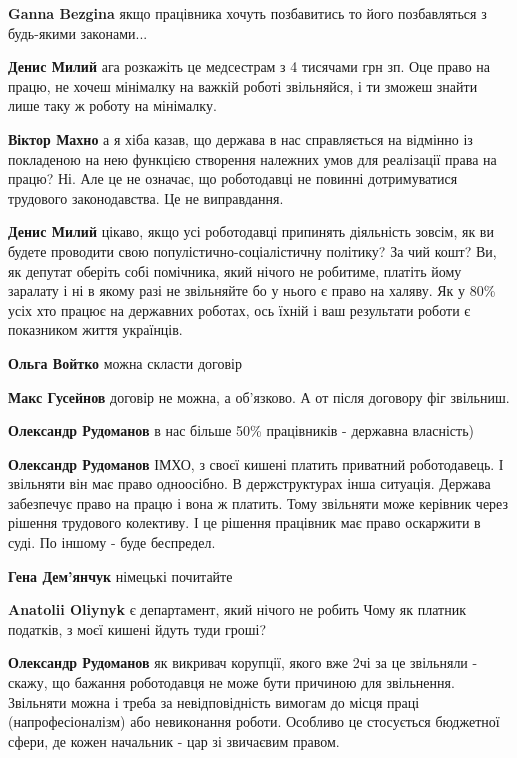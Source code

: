 \begin{itemize}
\begin{itemize}
\textbf{Ganna Bezgina} якщо працівника хочуть позбавитись то його позбавляться з будь-якими законами...

\textbf{Денис Милий} ага розкажіть це медсестрам з 4 тисячами грн зп. Оце право на працю, не хочеш мінімалку на важкій роботі звільняйся, і ти зможеш знайти лише таку ж роботу на мінімалку.

\textbf{Віктор Махно} а я хіба казав, що держава в нас справляється на відмінно із покладеною на нею функцією створення належних умов для реалізації права на працю? Ні. Але це не означає, що роботодавці не повинні дотримуватися трудового законодавства. Це не виправдання.

\textbf{Денис Милий} цікаво, якщо усі роботодавці припинять діяльність зовсім,
як ви будете проводити свою популістично-соціалістичну політику? За чий кошт?
Ви, як депутат оберіть собі помічника, який нічого не робитиме, платіть йому
заралату і ні в якому разі не звільняйте бо у нього є право на халяву. Як у 80\%
усіх хто працює на державних роботах, ось їхній і ваш результати роботи є
показником життя українців.

\textbf{Ольга Войтко} можна скласти договір

\textbf{Макс Гусейнов} договір не можна, а об'язково. А от після договору фіг звільниш.

\textbf{Олександр Рудоманов} в нас більше 50\% працівників - державна власність)

\textbf{Олександр Рудоманов} ІМХО, з своєї кишені платить приватний роботодавець. І звільняти він має право одноосібно.
В держструктурах інша ситуація. Держава забезпечує право на працю і вона ж платить. Тому звільняти може керівник через рішення трудового колективу. І це рішення працівник має право оскаржити в суді.
По іншому - буде беспредел.

\textbf{Гена Дем'янчук} німецькі почитайте


\textbf{Anatolii Oliynyk} є департамент, який нічого не робить
Чому як платник податків, з моєї кишені йдуть туди гроші?

\textbf{Олександр Рудоманов} як викривач корупції, якого вже 2чі за це звільняли - скажу, що бажання роботодавця не може бути причиною для звільнення. Звільняти можна і треба за невідповідність вимогам до місця праці (напрофесіоналізм) або невиконання роботи. Особливо це стосується бюджетної сфери, де кожен начальник - цар зі звичаєвим правом.


\end{itemize}
\end{itemize}

